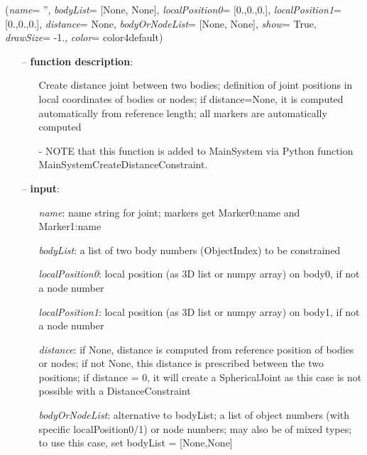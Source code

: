 \ei

%
\begin{flushleft}
\label{sec:mainsystemextensions:CreateDistanceConstraint}
({\it name}= '', {\it bodyList}= [None, None], {\it localPosition0}= [0.,0.,0.], {\it localPosition1}= [0.,0.,0.], {\it distance}= None, {\it bodyOrNodeList}= [None, None], {\it show}= True, {\it drawSize}= -1., {\it color}= color4default)
\end{flushleft}
\setlength{\itemindent}{0.7cm}
\begin{itemize}[leftmargin=0.7cm]
\item[--]
{\bf function description}: \vspace{-6pt}
\begin{itemize}[leftmargin=1.2cm]
\setlength{\itemindent}{-0.7cm}
\item[]Create distance joint between two bodies; definition of joint positions in local coordinates of bodies or nodes; if distance=None, it is computed automatically from reference length; all markers are automatically computed
\item[]- NOTE that this function is added to MainSystem via Python function MainSystemCreateDistanceConstraint.
\end{itemize}
\item[--]
{\bf input}: \vspace{-6pt}
\begin{itemize}[leftmargin=1.2cm]
\setlength{\itemindent}{-0.7cm}
\item[]{\it name}: name string for joint; markers get Marker0:name and Marker1:name
\item[]{\it bodyList}: a list of two body numbers (ObjectIndex) to be constrained
\item[]{\it localPosition0}: local position (as 3D list or numpy array) on body0, if not a node number
\item[]{\it localPosition1}: local position (as 3D list or numpy array) on body1, if not a node number
\item[]{\it distance}: if None, distance is computed from reference position of bodies or nodes; if not None, this distance is prescribed between the two positions; if distance = 0, it will create a SphericalJoint as this case is not possible with a DistanceConstraint
\item[]{\it bodyOrNodeList}: alternative to bodyList; a list of object numbers (with specific localPosition0/1) or node numbers; may also be of mixed types; to use this case, set bodyList = [None,None]

\end{itemize}
\end{itemize}
